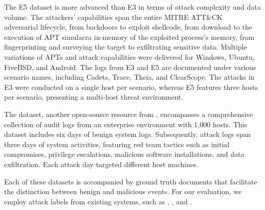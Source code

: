 The \darpa E5 dataset is more advanced than E3 in terms of attack complexity and data volume. The attackers' capabilities span the entire MITRE ATT\&CK~\cite{xiong2022cyber} adversarial lifecycle, from backdoors to exploit shellcode, from download to the execution of APT simulacra in-memory of the exploited process’s memory, from fingerprinting and surveying the target to exfiltrating sensitive data. Multiple variations of APTs and attack capabilities were delivered for Windows, Ubuntu, FreeBSD, and Android. The logs from E3 and E5 are documented under various scenario names, including Cadets, Trace, Theia, and ClearScope. The attacks in E3 were conducted on a single host per scenario, whereas E5 features three hosts per scenario, presenting a multi-host threat environment.

The \optc dataset, another open-source resource from \darpa, encompasses a comprehensive collection of audit logs from an enterprise environment with 1,000 hosts. This dataset includes six days of benign system logs. Subsequently, attack logs span three days of system activities, featuring red team tactics such as initial compromises, privilege escalations, malicious software installations, and data exfiltration. Each attack day targeted different host machines.

Each of these \darpa datasets is accompanied by ground truth documents that facilitate the distinction between benign and malicious events. For our evaluation, we employ attack labels from existing systems, such as \threatrace, \kairos, and \flash.



